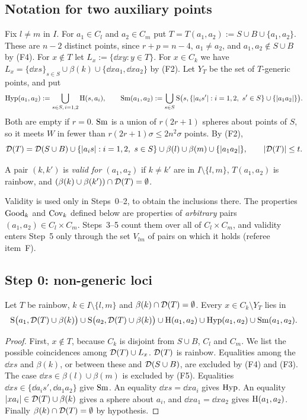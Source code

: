 \subsection{Notation for two auxiliary points}
Fix $l\ne m$ in $I$. For $a_1\in C_l$ and $a_2\in C_m$ put $T=T(a_1,a_2):=S\cup B\cup\{a_1,a_2\}$. These are $n-2$
distinct points, since $r+p=n-4$, $a_1\ne a_2$, and $a_1,a_2\notin S\cup B$ by (F4). For $x\notin T$ let
$L_x:=\{\dd xy:y\in T\}$. For $x\in C_k$ we have $L_x=\{\dd xs\}_{s\in S}\cup\beta(k)\cup\{\dd x{a_1},\dd x{a_2}\}$ by (F2).
Let $Y_T$ be the set of $T$-generic points, and put
\[
\mathrm{Hyp}(a_1,a_2):=\bigcup_{s\in S,\,i=1,2}\mathrm{H}(s,a_i),\qquad
\mathrm{Sm}(a_1,a_2):=\bigcup_{s\in S}\mathrm{S}\bigl(s,\{|a_is'|:i=1,2,\ s'\in S\}\cup\{|a_1a_2|\}\bigr).
\]
Both are empty if $r=0$. $\mathrm{Sm}$ is a union of $r(2r+1)$ spheres about points of $S$, so it meets $W$ in fewer than
$r(2r+1)\sigma\le2n^2\sigma$ points. By (F2),
\begin{equation}\label{eq:DT}
\mathcal{D}(T)=\mathcal{D}(S\cup B)\cup\{|a_is|:i=1,2,\ s\in S\}\cup\beta(l)\cup\beta(m)\cup\{|a_1a_2|\},\qquad|\mathcal{D}(T)|\le t .
\end{equation}

\begin{definition}[validity]\label{def:valid}
A pair $(k,k')$ is \emph{valid for $(a_1,a_2)$} if $k\ne k'$ are in $I\setminus\{l,m\}$, $T(a_1,a_2)$ is rainbow,
and $(\beta(k)\cup\beta(k'))\cap\mathcal{D}(T)=\emptyset$.
\end{definition}

Validity is used only in Steps~0--2, to obtain the inclusions there. The properties $\mathrm{Good}_k$ and $\mathrm{Cov}_k$ defined
below are properties of \emph{arbitrary} pairs $(a_1,a_2)\in C_l\times C_m$. Steps~3--5 count them over all of
$C_l\times C_m$, and validity enters Step~5 only through the set $V_{lm}$ of pairs on which it holds
(referee item~F).

\subsection{Step 0: non-generic loci}

\begin{lemma}[Step 0]\label{lem:step0}
Let $T$ be rainbow, $k\in I\setminus\{l,m\}$ and $\beta(k)\cap\mathcal{D}(T)=\emptyset$. Every $x\in C_k\setminus Y_T$ lies in
\[
\mathrm{S}\bigl(a_1,\mathcal{D}(T)\cup\beta(k)\bigr)\cup\mathrm{S}\bigl(a_2,\mathcal{D}(T)\cup\beta(k)\bigr)\cup\mathrm{H}(a_1,a_2)\cup\mathrm{Hyp}(a_1,a_2)\cup\mathrm{Sm}(a_1,a_2).
\]
\end{lemma}
\begin{proof}
First, $x\notin T$, because $C_k$ is disjoint from $S\cup B$, $C_l$ and $C_m$. We list the possible coincidences
among $\mathcal{D}(T)\cup L_x$. $\mathcal{D}(T)$ is rainbow. Equalities among the $\dd xs$ and $\beta(k)$, or between these
and $\mathcal{D}(S\cup B)$, are excluded by (F4) and (F3). The case $\dd xs\in\beta(l)\cup\beta(m)$ is excluded by (F5).
Equalities $\dd xs\in\{\dd{a_i}{s'},\dd{a_1}{a_2}\}$ give $\mathrm{Sm}$. An equality $\dd xs=\dd x{a_i}$ gives $\mathrm{Hyp}$. An
equality $|xa_i|\in\mathcal{D}(T)\cup\beta(k)$ gives a sphere about $a_i$, and $\dd x{a_1}=\dd x{a_2}$ gives
$\mathrm{H}(a_1,a_2)$. Finally $\beta(k)\cap\mathcal{D}(T)=\emptyset$ by hypothesis.
\end{proof}

